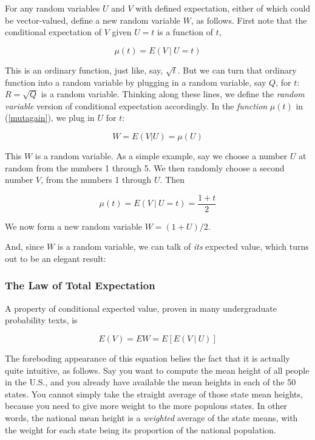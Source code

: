 For any random variables $U$ and $V$ with defined expectation, either of
which could be vector-valued, define a new random variable $W$, as
follows.  First note that the conditional expectation of $V$ given $U =
t$ is a function of $t$,

\begin{equation}
\label{mutagain}
\mu(t) = E(V ~|~ U = t)
\end{equation}

This is an ordinary function, just like, say, $\sqrt{t}$.  But we can
turn that ordinary function into a random variable by plugging in a
random variable, say $Q$, for $t$:  $R = \sqrt{Q}$ is a random variable.
Thinking along these lines, we define the {\it random variable} version
of conditional expectation accordingly.  In the {\it function} $\mu(t)$
in (\ref{mutagain}), we plug in $U$ for $t$:

\begin{equation}
W = E(V | U) = \mu(U)
\end{equation}

This $W$ is a random variable.  As a simple example, say we choose a
number $U$ at random from the numbers 1 through 5.  We then randomly
choose a second number $V$, from the numbers 1 through $U$.  Then

\begin{equation}
\mu(t) = E(V ~|~ U = t) = \frac{1+t}{2}
\end{equation}

We now form a new random variable $W = (1+U)/2$.

And, since $W$ is a random variable, we can talk of {\it its} expected
value, which turns out to be an elegant result:

\subsubsection{The Law of Total Expectation}
\label{totexpsec}

A property of conditional expected value, proven in many undergraduate
probability texts, is

\begin{equation}
\label{totexp}
E(V) = EW = E[E(V ~|~ U)]
\end{equation}

The foreboding appearance of this equation belies the fact that it is
actually quite intuitive, as follows.  Say you want to compute the mean
height of all people in the U.S., and you already have available the
mean heights in each of the 50 states.  You cannot simply take the
straight average of those state mean heights, because you need to give
more weight to the more populous states.  In other words, the national
mean height is a {\it weighted} average of the state means, with the
weight for each state being its proportion of the national
population.  

